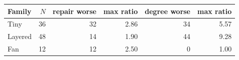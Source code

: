 \begin{tabular}{lrrrrr}
\toprule
Family & $N$ & repair worse & max ratio & degree worse & max ratio\\
\midrule
Tiny & 36 & 32 & 2.86 & 34 & 5.57\\
Layered & 48 & 14 & 1.90 & 44 & 9.28\\
Fan & 12 & 12 & 2.50 & 0 & 1.00\\
\bottomrule
\end{tabular}
